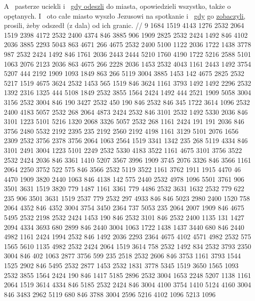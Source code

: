  A~ pasterze uciekli i~ \underline{gdy odeszli} do miasta, opowiedzieli wszystko, także o~ opętanych.
 I~ oto całe miasto wyszło Jezusowi na spotkanie i~ \underline{gdy} go \underline{zobaczyli,} prosili, żeby odszedł (z dala) od ich granic.
//
\endgl
\begingl
\lettrine[loversize=1,lraise=-1.3]{9 }{}%
 1684 1519 4143 1276 2532 2064 1519 2398 4172
{} 2532 2400 4374 846 3885 906 1909 2825 2532 2424 1492 846 4102 2036 3885 2293 5043 863 4671 266 4675
{} 2532 2400 5100 1122 2036 1722 1438 3778 987
{} 2532 2424 1492 846 1761 2036 2443 2444 5210 1760 4190 1722 5216 2588
{} 5101 1063 2076 2123 2036 863 4675 266 2228 2036 1453 2532 4043
{} 1161 2443 1492 3754 5207 444 2192 1909 1093 1849 863 266 5119 3004 3885 1453 142 4675 2825 2532 5217 1519 4675 3624
{} 2532 1453 565 1519 846 3624
{} 1161 3793 1492 {} 1492 2296 2532 1392 2316 1325 444 5108 1849
{} 2532 3855 1564 2424 1492 444 2521 1909 5058 3004 3156 2532 3004 846 190 3427 2532 450 190 846
{} 2532 846 345 1722 3614 1096 2532 2400 4183 5057 2532 268 2064 4873 2424 2532 846 3101
{} 2532 1492 {} 5330 2036 846 3101 1223 5101 5216 1320 2068 3326 5057 2532 268
{} 1161 2424 191 {} 191 2036 846 3756 2480 5532 2192 2395 235 2192 2560 2192
{} 4198 1161 3129 5101 {} 2076 1656 2309 2532 3756 2378 3756 2064 1063 2564 1519 3341 1342 235 268
{} 5119 4334 846 3101 2491 {} 3004 1223 5101 2249 2532 5330 4183 3522 1161 4675 3101 3756 3522
{} 2532 2424 2036 846 3361 1410 5207 3567 3996 1909 3745 2076 3326 846 3566 1161 2064 2250 3752 522 575 846 3566 2532 5119 3522
{} 1161 3762 {} 1911 1915 {} 4470 46 4470 1909 3820 2440 1063 {} 846 4138 142 575 2440 2532 4978 1096 5501
{} 3761 906 3501 3631 1519 3820 779 1487 1161 3361 779 4486 2532 3631 1632 2532 779 622 235 906 3501 3631 1519 2537 779 2532 297 4933
{} {} 846 846 5023 2980 2400 1520 {} 758 2064 {} 4352 846 4352 3004 3754 3450 2364 737 5053 235 2064 2007 1909 846 4675 5495 2532 2198
{} 2532 2424 1453 190 846 2532 {} 3101 846
{} 2532 2400 1135 131 1427 2094 4334 3693 680 2899 846 2440
{} 3004 1063 1722 1438 1437 3440 680 846 2440 4982
{} 1161 2424 1994 2532 846 1492 2036 2293 2364 4675 4102 4571 4982 2532 575 1565 5610 1135 4982
{} 2532 2424 2064 1519 3614 758 2532 1492 834 2532 3793 2350
{} 3004 846 402 1063 2877 3756 599 235 2518 2532 2606 {} 846
{} 3753 1161 3793 1544 {} 1525 2902 846 5495 2532 2877 1453
{} 2532 1831 3778 5345 1519 3650 1565 1093
{} 2532 3855 1564 2424 190 846 1417 5185 2896 2532 3004 1653 2248 5207 1138
{} 1161 2064 1519 3614 4334 846 5185 2532 2424 846 3004 4100 3754 1410 5124 4160 3004 846 3483 2962
{} 5119 680 846 3788 3004 2596 5216 4102 1096 5213 1096
